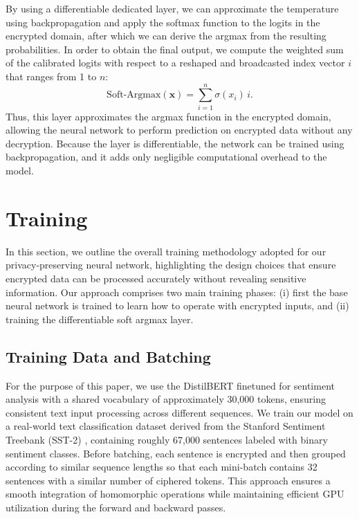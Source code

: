 \documentclass{article}
\begin{document}
By using a differentiable dedicated layer, we can approximate the temperature using backpropagation and apply the softmax function to the logits in the encrypted domain, after which we can derive the argmax from the resulting probabilities. In order to obtain the final output, we compute the weighted sum of the calibrated logits with respect to a reshaped and broadcasted index vector $i$ that ranges from 1 to $n$:
\[
\mathrm{Soft\text{-}Argmax}(\mathbf{x}) 
= \sum_{i=1}^{n} \sigma(x_i)\, i.
\]
Thus, this layer approximates the argmax function in the encrypted domain, allowing the neural network to perform prediction on encrypted data without any decryption. Because the layer is differentiable, the network can be trained using backpropagation, and it adds only negligible computational overhead to the model.

\section{Training}

In this section, we outline the overall training methodology adopted for our privacy-preserving neural network, highlighting the design choices that ensure encrypted data can be processed accurately without revealing sensitive information. Our approach comprises two main training phases: (i) first the base neural network is trained to learn how to operate with encrypted inputs, and (ii) training the differentiable soft argmax layer.

\subsection{Training Data and Batching}

For the purpose of this paper, we use the DistilBERT finetuned for sentiment analysis \cite{sanh2019distilbert} with a shared vocabulary of approximately 30,000 tokens, ensuring consistent text input processing across different sequences. We train our model on a real-world text classification dataset derived from the Stanford Sentiment Treebank (SST-2) \cite{socher2013recursive}, containing roughly 67,000 sentences labeled with binary sentiment classes. Before batching, each sentence is encrypted and then grouped according to similar sequence lengths so that each mini-batch contains 32 sentences with a similar number of ciphered tokens. This approach ensures a smooth integration of homomorphic operations while maintaining efficient GPU utilization during the forward and backward passes.
\end{document}
